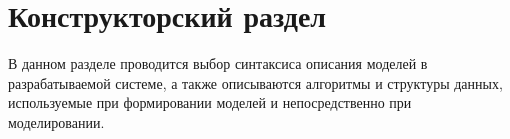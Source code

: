 \chapter{Конструкторский раздел}

В данном разделе проводится выбор синтаксиса описания моделей в разрабатываемой системе, а также описываются алгоритмы и структуры данных, используемые при формировании моделей и непосредственно при моделировании. 



